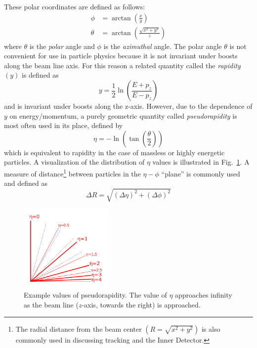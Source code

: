 These polar coordinates are defined as follows:
\begin{align}
\phi &= \arctan\left( {\frac{x}{y}} \right) \\
\theta &= \arctan \left( {\frac{\sqrt{x^2+y^2}}{z}} \right)
\label{eqn:polar_coordinates}
\end{align}
where $\theta$ is the \textit{polar} angle and $\phi$ is the \textit{azimuthal} angle.
The polar angle $\theta$ is not convenient for use in particle physics because it is not invariant under boosts along the beam line axis. For this reason a related quantity called the \textit{rapidity} $(y)$ is defined as
\begin{equation}
y = \frac{1}{2} \ln \left( \frac{E + p_z}{E-p_z} \right)
\label{eqn:rapidity}
\end{equation}
and is invariant under boosts along the z-axis. However, due to the dependence of $y$ on energy/momentum, a purely geometric quantity called \textit{pseudorapidity} is most often used in its place, defined by
\begin{equation}
\eta = -\ln \left(\tan\left( \frac{\theta}{2} \right) \right)
\label{eqn:pseudorapidity}
\end{equation}
which is equivalent to rapidity in the case of massless or highly energetic particles.
A visualization of the distribution of $\eta$ values is illustrated in Fig.~\ref{fig:pseudorapidity}.
A measure of distance\footnote{The radial distance from the beam center $\left(R = \sqrt{x^2 + y^2}\right)$ is also commonly used in discussing tracking and the Inner Detector.} between particles in the $\eta-\phi$ ``plane'' is commonly used and defined as
\begin{equation}
\Delta R = \sqrt{(\Delta \eta)^2 + (\Delta \phi)^2}
\label{eqn:deltaR}
\end{equation}

\begin{figure}
	\centering
	\includegraphics[width=0.4\textwidth]{pseudorapidity}
	\caption{Example values of pseudorapidity. The value of $\eta$ approaches infinity as the beam line ($z$-axis, towards the right) is approached. }
	\label{fig:pseudorapidity}
\end{figure}

